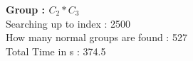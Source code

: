\textbf{Group : $C_2*C_3$}\\
Searching up to index : 2500\\
How many normal groups are found : 527\\
Total Time in s : 374.5\\
